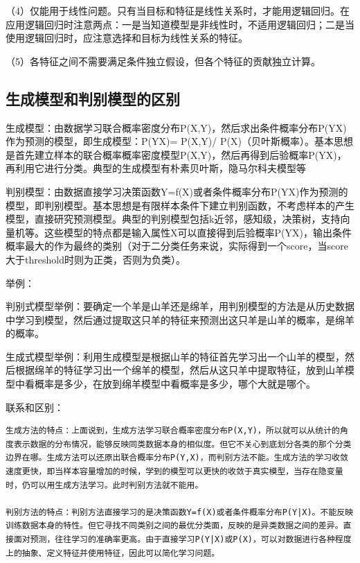（4）仅能用于线性问题。只有当目标和特征是线性关系时，才能用逻辑回归。在应用逻辑回归时注意两点：一是当知道模型是非线性时，不适用逻辑回归；二是当使用逻辑回归时，应注意选择和目标为线性关系的特征。

（5）各特征之间不需要满足条件独立假设，但各个特征的贡献独立计算。

\subsection{生成模型和判别模型的区别}\label{ux751fux6210ux6a21ux578bux548cux5224ux522bux6a21ux578bux7684ux533aux522b}

生成模型：由数据学习联合概率密度分布P(X,Y)，然后求出条件概率分布P(Y\textbar{}X)作为预测的模型，即生成模型：P(Y\textbar{}X)=
P(X,Y)/
P(X)（贝叶斯概率）。基本思想是首先建立样本的联合概率概率密度模型P(X,Y)，然后再得到后验概率P(Y\textbar{}X)，再利用它进行分类。典型的生成模型有朴素贝叶斯，隐马尔科夫模型等

判别模型：由数据直接学习决策函数Y=f(X)或者条件概率分布P(Y\textbar{}X)作为预测的模型，即判别模型。基本思想是有限样本条件下建立判别函数，不考虑样本的产生模型，直接研究预测模型。典型的判别模型包括k近邻，感知级，决策树，支持向量机等。这些模型的特点都是输入属性X可以直接得到后验概率P(Y\textbar{}X)，输出条件概率最大的作为最终的类别（对于二分类任务来说，实际得到一个score，当score大于threshold时则为正类，否则为负类）。

举例：

判别式模型举例：要确定一个羊是山羊还是绵羊，用判别模型的方法是从历史数据中学习到模型，然后通过提取这只羊的特征来预测出这只羊是山羊的概率，是绵羊的概率。

生成式模型举例：利用生成模型是根据山羊的特征首先学习出一个山羊的模型，然后根据绵羊的特征学习出一个绵羊的模型，然后从这只羊中提取特征，放到山羊模型中看概率是多少，在放到绵羊模型中看概率是多少，哪个大就是哪个。

联系和区别：

\begin{verbatim}
生成方法的特点：上面说到，生成方法学习联合概率密度分布P(X,Y)，所以就可以从统计的角度表示数据的分布情况，能够反映同类数据本身的相似度。但它不关心到底划分各类的那个分类边界在哪。生成方法可以还原出联合概率分布P(Y,X)，而判别方法不能。生成方法的学习收敛速度更快，即当样本容量增加的时候，学到的模型可以更快的收敛于真实模型，当存在隐变量时，仍可以用生成方法学习。此时判别方法就不能用。

判别方法的特点：判别方法直接学习的是决策函数Y=f(X)或者条件概率分布P(Y|X)。不能反映训练数据本身的特性。但它寻找不同类别之间的最优分类面，反映的是异类数据之间的差异。直接面对预测，往往学习的准确率更高。由于直接学习P(Y|X)或P(X)，可以对数据进行各种程度上的抽象、定义特征并使用特征，因此可以简化学习问题。
\end{verbatim}

